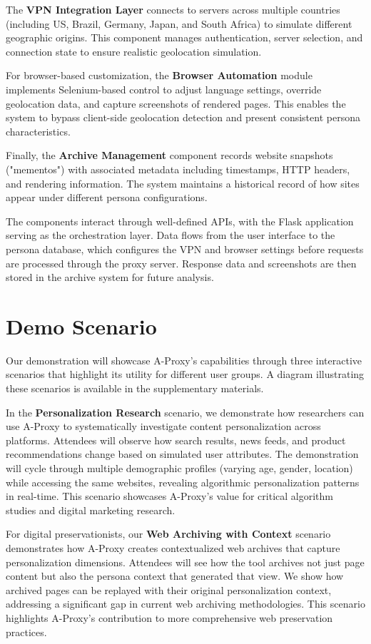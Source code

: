 \documentclass[sigconf]{acmart}
\begin{document}
The \textbf{VPN Integration Layer} connects to servers across multiple countries (including US, Brazil, Germany, Japan, and South Africa) to simulate different geographic origins. This component manages authentication, server selection, and connection state to ensure realistic geolocation simulation.

For browser-based customization, the \textbf{Browser Automation} module implements Selenium-based control to adjust language settings, override geolocation data, and capture screenshots of rendered pages. This enables the system to bypass client-side geolocation detection and present consistent persona characteristics.

Finally, the \textbf{Archive Management} component records website snapshots ("mementos") with associated metadata including timestamps, HTTP headers, and rendering information. The system maintains a historical record of how sites appear under different persona configurations.

The components interact through well-defined APIs, with the Flask application serving as the orchestration layer. Data flows from the user interface to the persona database, which configures the VPN and browser settings before requests are processed through the proxy server. Response data and screenshots are then stored in the archive system for future analysis.

\section{Demo Scenario}
Our demonstration will showcase A-Proxy's capabilities through three interactive scenarios that highlight its utility for different user groups. A diagram illustrating these scenarios is available in the supplementary materials.

In the \textbf{Personalization Research} scenario, we demonstrate how researchers can use A-Proxy to systematically investigate content personalization across platforms. Attendees will observe how search results, news feeds, and product recommendations change based on simulated user attributes. The demonstration will cycle through multiple demographic profiles (varying age, gender, location) while accessing the same websites, revealing algorithmic personalization patterns in real-time. This scenario showcases A-Proxy's value for critical algorithm studies and digital marketing research.

For digital preservationists, our \textbf{Web Archiving with Context} scenario demonstrates how A-Proxy creates contextualized web archives that capture personalization dimensions. Attendees will see how the tool archives not just page content but also the persona context that generated that view. We show how archived pages can be replayed with their original personalization context, addressing a significant gap in current web archiving methodologies. This scenario highlights A-Proxy's contribution to more comprehensive web preservation practices.
\end{document}

